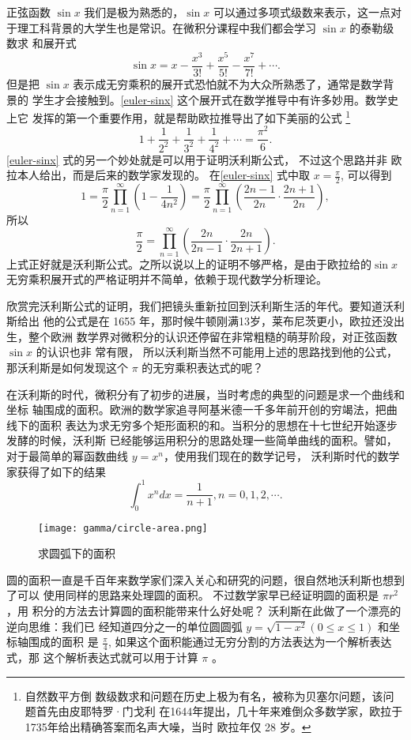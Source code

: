 {正弦函数 $\sin x$ 我们是极为熟悉的，$\sin x$ 可以通过多项式级数来表示，这一点对
于理工科背景的大学生也是常识。在微积分课程中我们都会学习 $\sin x$ 的泰勒级数求
和展开式
$$ \sin x = x - \frac{x^3}{3!} + \frac{x^5}{5!} - \frac{x^7}{7!} + \cdots  .$$
但是把 $\sin x$ 表示成无穷乘积的展开式恐怕就不为大众所熟悉了，通常是数学背景的
学生才会接触到。\eqref{euler-sinx} 这个展开式在数学推导中有许多妙用。数学史上它
发挥的第一个重要作用，就是帮助欧拉推导出了如下美丽的公式 \footnote{自然数平方倒
数级数求和问题在历史上极为有名，被称为贝塞尔问题，该问题首先由皮耶特罗·门戈利
在1644年提出，几十年来难倒众多数学家，欧拉于1735年给出精确答案而名声大噪，当时
欧拉年仅 28 岁。}
$$ 1 + \frac{1}{2^2} + \frac{1}{3^2} + \frac{1}{4^2} +  \cdots  = \frac{\pi^2}{6} . $$ 
\eqref{euler-sinx} 式的另一个妙处就是可以用于证明沃利斯公式， 不过这个思路并非
欧拉本人给出，而是后来的数学家发现的。 在\eqref{euler-sinx} 式中取
$x=\frac{\pi}{2}$, 可以得到
$$ 1 = \frac{\pi}{2} \prod_{n=1}^\infty\left(1 - \frac{1}{4n^2}\right)
= \frac{\pi}{2} \prod_{n=1}^\infty\left(\frac{2n-1}{2n} \cdot \frac{2n+1}{2n}\right), 
$$
所以
$$ \frac{\pi}{2} = \prod_{n=1}^\infty\left(\frac{2n}{2n-1} \cdot \frac{2n}{2n+1}\right) .
$$
上式正好就是沃利斯公式。之所以说以上的证明不够严格，是由于欧拉给的$\sin x$
无穷乘积展开式的严格证明并不简单，依赖于现代数学分析理论。 

欣赏完沃利斯公式的证明，我们把镜头重新拉回到沃利斯生活的年代。要知道沃利斯给出
他的公式是在 1655 年，那时候牛顿刚满13岁，莱布尼茨更小，欧拉还没出生，整个欧洲
数学界对微积分的认识还停留在非常粗糙的萌芽阶段，对正弦函数 $\sin x$ 的认识也非
常有限， 所以沃利斯当然不可能用上述的思路找到他的公式， 那沃利斯是如何发现这个
$\pi$ 的无穷乘积表达式的呢？

在沃利斯的时代，微积分有了初步的进展，当时考虑的典型的问题是求一个曲线和坐标
轴围成的面积。欧洲的数学家追寻阿基米德一千多年前开创的穷竭法，把曲线下的面积
表达为求无穷多个矩形面积的和。当积分的思想在十七世纪开始逐步发酵的时候，沃利斯
已经能够运用积分的思路处理一些简单曲线的面积。譬如，对于最简单的幂函数曲线
$y=x^n$，使用我们现在的数学记号， 沃利斯时代的数学家获得了如下的结果
$$ \int_0^1 x^n dx = \frac{1}{n+1},  n=0,1,2,\cdots .$$

\begin{figure}[htbp]
\centering
\texttt{[image: gamma/circle-area.png]}
\caption{求圆弧下的面积}
\end{figure}

圆的面积一直是千百年来数学家们深入关心和研究的问题，很自然地沃利斯也想到了可以
使用同样的思路来处理圆的面积。 不过数学家早已经证明圆的面积是 $\pi r^2$，用
积分的方法去计算圆的面积能带来什么好处呢？ 沃利斯在此做了一个漂亮的逆向思维：我们已
经知道四分之一的单位圆圆弧 $y=\sqrt{1-x^2} (0 \le x \le 1)$ 和坐标轴围成的面积
是 $\frac{\pi}{4}$, 如果这个面积能通过无穷分割的方法表达为一个解析表达式，那
这个解析表达式就可以用于计算 $\pi$ 。

}

